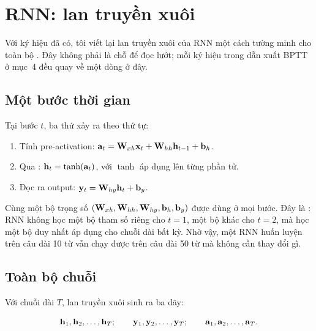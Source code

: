 %

\section{RNN: lan truyền xuôi}
\label{sec:ch01-rnn-xuoi}

Với ký hiệu đã có, tôi viết lại lan truyền xuôi của RNN một cách tường minh
cho toàn bộ . Đây không phải là chỗ để đọc lướt; mỗi ký
hiệu trong dẫn
xuất BPTT ở mục~4 đều quay về một dòng ở đây.

\subsection{Một bước thời gian}

Tại bước $t$, ba thứ xảy ra theo thứ tự:

\begin{enumerate}
  \item Tính pre-activation:
    $\mathbf{a}_t = \mathbf{W}_{xh} \mathbf{x}_t
                 + \mathbf{W}_{hh} \mathbf{h}_{t-1}
                 + \mathbf{b}_h$.
  \item Qua :
    $\mathbf{h}_t = \tanh(\mathbf{a}_t)$,
    với $\tanh$ áp dụng lên từng phần tử.
  \item Đọc ra output:
    $\mathbf{y}_t = \mathbf{W}_{hy} \mathbf{h}_t + \mathbf{b}_y$.
\end{enumerate}

Cùng một bộ trọng số $(\mathbf{W}_{xh}, \mathbf{W}_{hh}, \mathbf{W}_{hy},
\mathbf{b}_h, \mathbf{b}_y)$ được dùng ở mọi bước. Đây là
\textbf{}: RNN không học một bộ tham số
riêng cho $t=1$, một bộ
khác cho $t=2$, mà học một bộ duy nhất áp dụng cho chuỗi dài bất kỳ. Nhờ vậy,
một RNN huấn luyện trên câu dài 10 từ vẫn chạy được trên câu dài 50 từ mà
không cần thay đổi gì.

\subsection{Toàn bộ chuỗi}

Với chuỗi dài $T$, lan truyền xuôi sinh ra ba dãy:

\[
  \mathbf{h}_1, \mathbf{h}_2, \dots, \mathbf{h}_T; \qquad
  \mathbf{y}_1, \mathbf{y}_2, \dots, \mathbf{y}_T; \qquad
  \mathbf{a}_1, \mathbf{a}_2, \dots, \mathbf{a}_T.
\]

